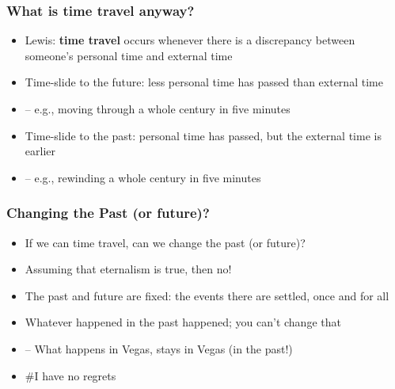 \begin{frame}
\frametitle{What is time travel anyway?}

\begin{itemize}[<+->]

\item Lewis: \textbf{time travel} occurs whenever there is a discrepancy between someone’s personal time and external time

\item Time-slide to the future: less personal time has passed than external time 
\item[] -- e.g., moving through a whole century in five minutes

\item Time-slide to the past: personal time has passed, but the external time is earlier
\item[] -- e.g., rewinding a whole century in five minutes


\end{itemize}
\end{frame}

\begin{frame}
\frametitle{Changing the Past (or future)?}

\begin{itemize}[<+->]

\item If we can time travel, can we change the past (or future)?

\item Assuming that eternalism is true, then no!
\item The past and future are fixed: the events there are settled, once and for all
\item Whatever happened in the past happened; you can’t change that
\item[] -- What happens in Vegas, stays in Vegas (in the past!)

\item[] \#I have no regrets 

\end{itemize}
\end{frame}



